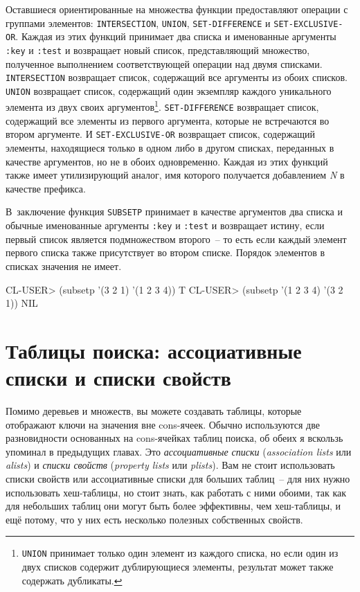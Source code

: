 Оставшиеся ориентированные на множества функции предоставляют операции с группами
элементов: \lstinline{INTERSECTION}, \lstinline{UNION}, \lstinline{SET-DIFFERENCE} и
\lstinline{SET-EXCLUSIVE-OR}.  Каждая из этих функций принимает два списка и именованные
аргументы \lstinline{:key} и \lstinline{:test} и возвращает новый список, представляющий множество,
полученное выполнением соответствующей операции над двумя списками. \lstinline{INTERSECTION}
возвращает список, содержащий все аргументы из обоих списков. \lstinline{UNION} возвращает
список, содержащий один экземпляр каждого уникального элемента из двух своих
аргументов\footnote{\lstinline{UNION} принимает только один элемент из каждого списка, но если
  один из двух списков содержит дублирующиеся элементы, результат может также содержать
  дубликаты.}\hspace{\footnotenegspace}. \lstinline{SET-DIFFERENCE} возвращает список, содержащий все элементы из первого
аргумента, которые не встречаются во втором аргументе. И \lstinline{SET-EXCLUSIVE-OR}
возвращает список, содержащий элементы, находящиеся только в одном либо в другом списках,
переданных в качестве аргументов, но не в обоих одновременно. Каждая из этих функций также
имеет утилизирующий аналог, имя которого получается добавлением \textit{N} в качестве
префикса.

В~заключение функция \lstinline{SUBSETP} принимает в качестве аргументов два списка и обычные
именованные аргументы \lstinline{:key} и \lstinline{:test} и возвращает истину, если первый список
является подмножеством второго~-- то есть если каждый элемент первого списка также
присутствует во втором списке.  Порядок элементов в списках значения не имеет.

\begin{myverb}
CL-USER> (subsetp '(3 2 1) '(1 2 3 4))
T
CL-USER> (subsetp '(1 2 3 4) '(3 2 1))
NIL
\end{myverb}


\section{Таблицы поиска: ассоциативные списки и списки свойств}

Помимо деревьев и множеств, вы можете создавать таблицы, которые отображают ключи на
значения вне cons-ячеек. Обычно используются две разновидности основанных на cons-ячейках
таблиц поиска, об обеих я вскользь упоминал в предыдущих главах. Это \textit{ассоциативные
  списки} (\textit{association lists} или \textit{alists}) и \textit{списки свойств}
(\textit{property lists} или \textit{plists}). Вам не стоит использовать списки свойств
или ассоциативные списки для больших таблиц~-- для них нужно использовать хеш-таблицы, но
стоит знать, как работать с ними обоими, так как для небольших таблиц они могут быть более
эффективны, чем хеш-таблицы, и ещё потому, что у них есть несколько полезных собственных
свойств.
 
